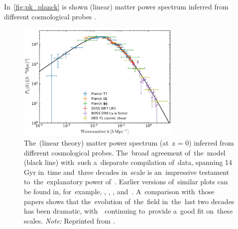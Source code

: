 In~\autoref{fig:pk_planck} is shown (linear) matter power spectrum inferred from different cosmological probes \parencite{2018arXiv180706205P}.
\begin{figure}[hbt]
    \centering
    \includegraphics[width=0.7\textwidth]{cosmo_evol/pk_planck.png}
    \caption{The~(linear theory) matter power spectrum (at~z = 0) inferred from different cosmological probes. The~broad agreement of~the~model (black line) with~such a~disparate compilation of~data, spanning 14 Gyr in~time and~three decades in~scale is an~impressive testament to~the~explanatory power of~\LCDM. Earlier versions of~similar plots can be found in, for~example, \textcite{1994ARA&A..32..319W}, \textcite{1995Sci...268..829S}, \textcite{2002PhRvD..66j3508T}, and~\textcite{2004ApJ...606..702T}. A~comparison with~those papers shows that the~evolution of~the~field in~the~last two decades has been dramatic, with~\LCDM\ continuing to~provide a~good fit on~these scales. \textit{Note:} Reprinted from \textcite{2018arXiv180706205P}.}
    \label{fig:pk_planck}
\end{figure}

